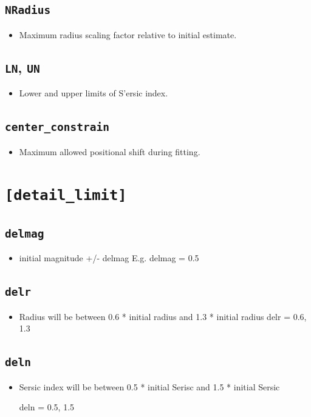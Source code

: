 \documentclass[11pt]{article}
\begin{document}
\subsection{\texttt{NRadius}}
\begin{itemize}
\item Maximum radius scaling factor relative to initial estimate.
\end{itemize}

\subsection{\texttt{LN}, \texttt{UN}}
\begin{itemize}
\item Lower and upper limits of S'ersic index.
\end{itemize}

\subsection{\texttt{center\_constrain}}
\begin{itemize}
\item Maximum allowed positional shift during fitting.
\end{itemize}

\section{\texttt{[detail\_limit]}}

\subsection{\texttt{delmag}}
\begin{itemize}
\item initial magnitude +/- delmag
E.g. delmag = 0.5
\end{itemize}

\subsection{\texttt{delr}}
\begin{itemize}
\item Radius will be between 0.6 * initial radius and 1.3 * initial radius 
delr = 0.6, 1.3
\end{itemize}

\subsection{\texttt{deln}}
\begin{itemize}
\item Sersic index will be between 0.5 * initial Serisc and 1.5 * initial Sersic

deln = 0.5, 1.5
\end{itemize}
\end{document}
